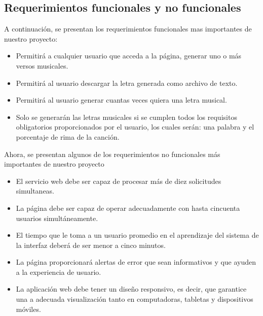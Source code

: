 \documentclass[12pt, a4paper, titlepage]{report}
\begin{document}
		\subsection{Requerimientos funcionales y no funcionales}
		A continuación, se presentan los requerimientos funcionales mas importantes de nuestro proyecto:
		\begin{itemize}
			\item Permitirá a cualquier usuario que acceda a la página, generar uno o más versos musicales.
			\item Permitirá al usuario descargar la letra generada como archivo de texto.
			\item Permitirá al usuario generar cuantas veces quiera una letra musical.
			\item Solo se generarán las letras musicales si se cumplen todos los requisitos obligatorios proporcionados por el usuario, los cuales serán: una palabra y el porcentaje de rima de la canción.
		\end{itemize}
		Ahora, se presentan algunos de los requerimientos no funcionales más importantes de nuestro proyecto
		\begin{itemize}
			\item El servicio web debe ser capaz de procesar más de diez solicitudes simultaneas.
			\item La página debe ser capaz de operar adecuadamente con hasta cincuenta usuarios simultáneamente.
			\item El tiempo que le toma a un usuario promedio en el aprendizaje del sistema de la interfaz deberá de ser menor a cinco minutos.
			\item La página proporcionará alertas de error que sean informativos y que ayuden a la experiencia de usuario.
			\item La aplicación web debe tener un diseño responsivo, es decir, que garantice una a adecuada visualización tanto en computadoras, tabletas y dispositivos móviles.
		\end{itemize}
	\newpage
\end{document}
